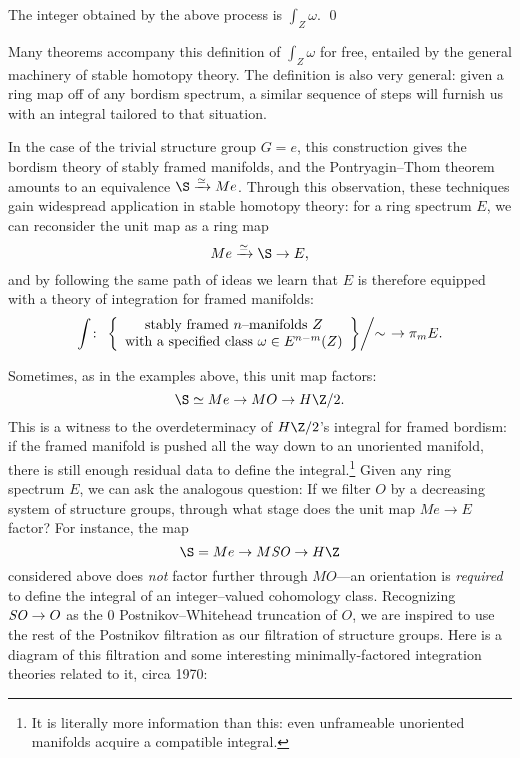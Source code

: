 \begin{lemma*}%
The integer obtained by the above process is \(\int_Z \omega\). \qed
\end{lemma*}

\noindent Many theorems accompany this definition of \(\int_Z \omega\) for free, entailed by the general machinery of stable homotopy theory.  The definition is also very general: given a ring map off of any bordism spectrum, a similar sequence of steps will furnish us with an integral tailored to that situation.

In the case of the trivial structure group \(G = e\), this construction gives the bordism theory of stably framed manifolds, and the Pontryagin--Thom theorem amounts to an equivalence \(\S \xrightarrow{\simeq} Me\).  Through this observation, these techniques gain widespread application in stable homotopy theory: for a ring spectrum \(E\), we can reconsider the unit map as a ring map \[Me \xrightarrow{\simeq} \S \to E,\] and by following the same path of ideas we learn that \(E\) is therefore equipped with a theory of integration for framed manifolds: \[\int\colon\thinspace \left. \left\{ \begin{array}{c}\text{stably framed \(n\)--manifolds \(Z\)} \\ \text{with a specified class \(\omega \in E^{n-m}(Z)\)} \end{array}\right\} \middle/ \sim \right. \to \pi_m E.\]

Sometimes, as in the examples above, this unit map factors: \[\S \simeq Me \to MO \to H\Z/2.\]  This is a witness to the overdeterminacy of \(H\Z/2\)'s integral for framed bordism: if the framed manifold is pushed all the way down to an unoriented manifold, there is still enough residual data to define the integral.\footnote{It is literally more information than this: even unframeable unoriented manifolds acquire a compatible integral.}  Given any ring spectrum \(E\), we can ask the analogous question: If we filter \(O\) by a decreasing system of structure groups, through what stage does the unit map \(Me \to E\) factor?  For instance, the map \[\S = Me \to M\SO \to H\Z\] considered above does \emph{not} factor further through \(MO\)---an orientation is \emph{required} to define the integral of an integer--valued cohomology class.  Recognizing \(\mathit{SO} \to O\) as the \(0\){\th} Postnikov--Whitehead truncation of \(O\), we are inspired to use the rest of the Postnikov filtration as our filtration of structure groups.  Here is a diagram of this filtration and some interesting minimally-factored integration theories related to it, circa 1970:
\begin{center}
\end{center}

